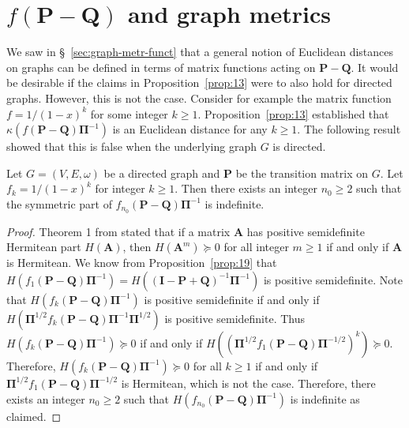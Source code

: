 \section{$f(\mathbf{P} - \mathbf{Q})$ and graph metrics} \label{sec:fmathbfp-mathbfq-gra} We saw in
\S~\ref{sec:graph-metr-funct} that a general notion of Euclidean distances on graphs can be defined in terms of matrix
functions acting on $\mathbf{P} - \mathbf{Q}$. It would be desirable if the claims in Proposition~\ref{prop:13} were to
also hold for directed graphs. However, this is not the case. Consider for example the matrix function $f = 1/(1-x)^{k}$
for some integer $k \geq 1$. Proposition~\ref{prop:13} established that $\kappa(f(\mathbf{P} -
\mathbf{Q})\bm{\Pi}^{-1})$ is an Euclidean distance for any $k \geq 1$.  The following result showed that this is false
when the underlying graph $G$ is directed.  \begin{proposition} \label{prop:25} Let $G = (V,E,\omega)$ be a directed
  graph and $\mathbf{P}$ be the transition matrix on $G$. Let $f_k = 1/(1-x)^{k}$ for integer $k \geq 1$. Then there
  exists an integer $n_0 \geq 2$ such that the symmetric part of $f_{n_0}(\mathbf{P} - \mathbf{Q})\bm{\Pi}^{-1}$ is
  indefinite.  \end{proposition} \begin{proof} Theorem 1 from \citet{johnson75:_power_matric_posit_defin_real_part}
    stated that if a matrix $\mathbf{A}$ has positive semidefinite Hermitean part $H(\mathbf{A})$, then
    $H(\mathbf{A}^{m}) \succeq 0$ for all integer $m \geq 1$ if and only if $\mathbf{A}$ is Hermitean. We know from
    Proposition~\ref{prop:19} that $H(f_1(\mathbf{P} - \mathbf{Q})\bm{\Pi}^{-1}) = H((\mathbf{I} - \mathbf{P} +
    \mathbf{Q})^{-1}\bm{\Pi}^{-1})$ is positive semidefinite. Note that $H(f_{k}(\mathbf{P} - \mathbf{Q})\bm{\Pi}^{-1})$
    is positive semidefinite if and only if $H(\bm{\Pi}^{1/2}f_{k}(\mathbf{P} - \mathbf{Q}) \bm{\Pi}^{-1}
    \bm{\Pi}^{1/2})$ is positive semidefinite. Thus $H(f_{k}(\mathbf{P} - \mathbf{Q})\bm{\Pi}^{-1}) \succeq 0$ if and
    only if $H((\bm{\Pi}^{1/2}f_{1}(\mathbf{P} - \mathbf{Q})\bm{\Pi}^{-1/2})^{k}) \succeq 0$. Therefore,
    $H(f_{k}(\mathbf{P} - \mathbf{Q})\bm{\Pi}^{-1}) \succeq 0$ for all $k \geq 1$ if and only if
    $\bm{\Pi}^{1/2}f_{1}(\mathbf{P} - \mathbf{Q})\bm{\Pi}^{-1/2}$ is Hermitean, which is not the case. Therefore, there
    exists an integer $n_0 \geq 2$ such that $H(f_{n_0}(\mathbf{P} - \mathbf{Q})\bm{\Pi}^{-1})$ is indefinite as
    claimed.  \end{proof}
%
